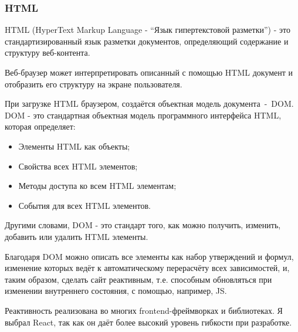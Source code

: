 \subsubsection{HTML}

HTML (HyperText Markup Language - ``Язык гипертекстовой разметки'') - это стандартизированный язык разметки документов, определяющий содержание и структуру веб-контента.

Веб-браузер может интерпретировать описанный с помощью HTML документ и отобразить его структуру на экране пользователя.

При загрузке HTML браузером, создаётся объектная модель документа~-~DOM. DOM - это стандартная объектная модель программного интерфейса HTML, которая определяет:

\begin{itemize}
  \item Элементы HTML как объекты;
  \item Свойства всех HTML элементов;
  \item Методы доступа ко всем HTML элементам;
  \item События для всех HTML элементов.
\end{itemize}

Другими словами, DOM - это стандарт того, как можно получить, изменить, добавить или удалить HTML элементы.

Благодаря DOM можно описать все элементы как набор утверждений и формул, изменение которых ведёт к автоматическому перерасчёту всех зависимостей, и, таким образом, сделать сайт реактивным, т.е. способным обновляться при изменении внутреннего состояния, с помощью, например, JS.

Реактивность реализована во многих frontend-фреймворках и библиотеках. Я выбрал React, так как он даёт более высокий уровень гибкости при разработке.